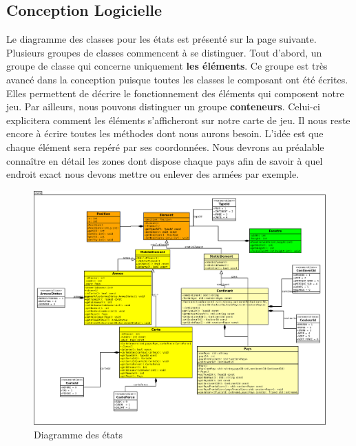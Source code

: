 \subsection{Conception Logicielle}
Le diagramme des classes pour les états est présenté sur la page suivante. Plusieurs groupes de classes commencent à se distinguer. 
Tout d'abord, un groupe de classe qui concerne uniquement \textbf{les éléments}. Ce groupe est très avancé dans la conception puisque toutes les classes le composant ont été écrites. Elles permettent de décrire le fonctionnement des éléments qui composent notre jeu. 
\newline 
\newline 
Par ailleurs, nous pouvons distinguer un groupe \textbf{conteneurs}. Celui-ci explicitera comment les éléments s'afficheront sur notre carte de jeu. Il nous reste encore à écrire toutes les méthodes dont nous aurons besoin. L'idée est que chaque élément sera repéré par ses coordonnées. Nous devrons au préalable connaître en détail les zones dont dispose chaque pays afin de savoir à quel endroit exact nous devons mettre ou enlever des armées par exemple.  

\newpage

\begin{landscape}
    \begin{figure}[!htbp]
        \centering
        \includegraphics[width=21cm]{Images/state.png}
        \caption{Diagramme des états}
        \label{fig:textures_plateau}
    \end{figure}
\end{landscape}